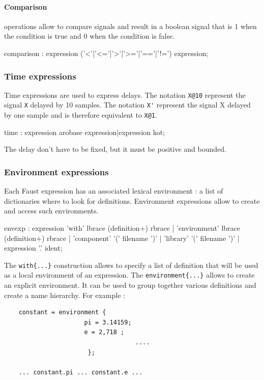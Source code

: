 \documentclass{article}
\begin{document}
\paragraph{Comparison} operations allow to compare signals and result in a boolean signal that is 1 when the condition is true and 0 when the condition is false.

\begin{rail}
comparison : expression ('<'|'<='|'>'|'>='|'=='|'!=') expression;
\end{rail}



\subsubsection{Time expressions}
Time expressions are used to express delays. The notation \lstinline'X@10' represent the signal \lstinline'X' delayed by 10 samples. The notation \lstinline"X'" represent the signal X delayed by one sample and is therefore equivalent to \lstinline'X@1'.
\begin{rail}
time : expression arobase expression|expression kot; 
\end{rail}
The delay don't have to be fixed, but it must be positive and bounded.

\subsubsection{Environment expressions}
Each Faust expression has an associated lexical environment : a list of dictionaries where to look for definitions. Environment expressions allow to create and access such environments.

\begin{rail}
envexp :    expression 'with' lbrace (definition+) rbrace
          | 'environment' lbrace (definition+) rbrace
          | 'component' '(' filename ')'
          | 'library' '(' filename ')'
		  | expression '.' ident;
          
\end{rail}

The \lstinline'with{...}' construction allows to specify a list of definition that will be used as a local environment of an expression. The \lstinline'environment{...}' allows to create an explicit environment. It can be used to group together various definitions and create a name hierarchy. For example :

\begin{lstlisting}
    constant = environment {
                      pi = 3.14159;
                      e = 2,718 ;
                                    ....
                       };

    ... constant.pi ... constant.e ...
\end{lstlisting}
\end{document}
